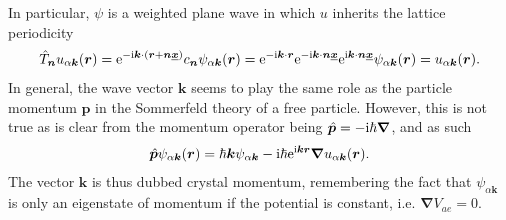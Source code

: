 In particular, $\psi$ is a weighted plane wave in which $u$ inherits the lattice periodicity
\begin{align}
    \hat T_{\bm n} u_{\alpha{\bm k}}({\bm r})
    =
    \mathrm e^{-\mathrm i{\bm k}\cdot \left( {\bm r}+{\bm n}\underline{\bm x} \right)}c_{\bm n}\psi_{\alpha{\bm k}}({\bm r})
    =
    \mathrm e^{-\mathrm i{\bm k}\cdot {\bm r}}\mathrm e^{-\mathrm i{\bm k}\cdot {\bm n}\underline{\bm x}}\mathrm e^{\mathrm i{\bm k}\cdot {\bm n}\underline{\bm x}}\psi_{\alpha{\bm k}}({\bm r})
    =
    u_{\alpha{\bm k}}({\bm r}).
\end{align}
In general, the wave vector $\bm k$ seems to play the same role as the particle momentum $\bm p$ in the Sommerfeld theory of a free particle.
However, this is not true as is clear from the momentum operator being $\hat{\bm p}=-\mathrm i\hbar\bm \nabla$, and as such
\begin{align}
  \hat{\bm p}\psi_{\alpha{\bm k}}({\bm r}) = \hbar{\bm k}\psi_{\alpha{\bm k}} - \mathrm i\hbar\mathrm e^{\mathrm i{\bm k}{\bm r}}\bm\nabla u_{\alpha \bm k}(\bm r).
\end{align}
The vector ${\bm k}$ is thus dubbed crystal momentum, remembering the fact that $\psi_{\alpha{\bm k}}$ is only an eigenstate of momentum if the potential is constant, i.e. $\bm\nabla V_{ae}=0$.

